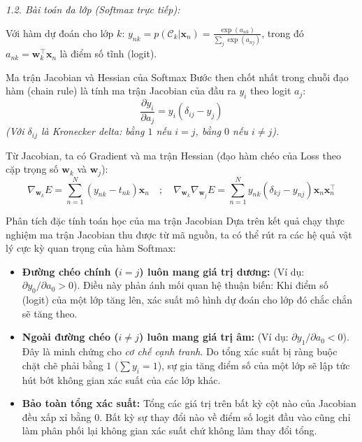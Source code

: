 \noindent\textcolor{infocolor}{\textit{1.2. Bài toán đa lớp (Softmax trực tiếp):}}

Với hàm dự đoán cho lớp $k$: $y_{nk} = p(\mathcal{C}_k | \mathbf{x}_n) = \frac{\exp(a_{nk})}{\sum_j \exp(a_{nj})}$, trong đó $a_{nk} = \mathbf{w}_k^\top \mathbf{x}_n$ là điểm số tĩnh (logit).

\begin{importantbox}{Ma trận Jacobian và Hessian của Softmax}
Bước then chốt nhất trong chuỗi đạo hàm (chain rule) là tính ma trận Jacobian của đầu ra $y_i$ theo logit $a_j$:
\begin{equation}
    \frac{\partial y_i}{\partial a_j} = y_i(\delta_{ij} - y_j)
\end{equation}
\textit{(Với $\delta_{ij}$ là Kronecker delta: bằng $1$ nếu $i=j$, bằng $0$ nếu $i \neq j$).}

Từ Jacobian, ta có Gradient và ma trận Hessian (đạo hàm chéo của Loss theo cặp trọng số $\mathbf{w}_k$ và $\mathbf{w}_j$):
\begin{equation}
    \nabla_{\mathbf{w}_k} E = \sum_{n=1}^N (y_{nk} - t_{nk})\mathbf{x}_n \quad ; \quad \nabla_{\mathbf{w}_k} \nabla_{\mathbf{w}_j} E = \sum_{n=1}^N y_{nk}(\delta_{kj} - y_{nj}) \mathbf{x}_n \mathbf{x}_n^\top
\end{equation}
\end{importantbox}

\begin{notebox}{Phân tích đặc tính toán học của ma trận Jacobian}
Dựa trên kết quả chạy thực nghiệm ma trận Jacobian thu được từ mã nguồn, ta có thể rút ra các hệ quả vật lý cực kỳ quan trọng của hàm Softmax:
\begin{itemize}
    \item \textbf{Đường chéo chính ($i = j$) luôn mang giá trị dương:} (Ví dụ: $\partial y_0/\partial a_0 > 0$). Điều này phản ánh mối quan hệ thuận biến: Khi điểm số (logit) của một lớp tăng lên, xác suất mô hình dự đoán cho lớp đó chắc chắn sẽ tăng theo.
    \item \textbf{Ngoài đường chéo ($i \neq j$) luôn mang giá trị âm:} (Ví dụ: $\partial y_1/\partial a_0 < 0$). Đây là minh chứng cho \textit{cơ chế cạnh tranh}. Do tổng xác suất bị ràng buộc chặt chẽ phải bằng $1$ ($\sum y_i = 1$), sự gia tăng điểm số của một lớp sẽ lập tức hút bớt không gian xác suất của các lớp khác.
    \item \textbf{Bảo toàn tổng xác suất:} Tổng các giá trị trên bất kỳ cột nào của Jacobian đều xấp xỉ bằng $0$. Bất kỳ sự thay đổi nào về điểm số logit đầu vào cũng chỉ làm phân phối lại không gian xác suất chứ không làm thay đổi tổng.
\end{itemize}
\end{notebox}

